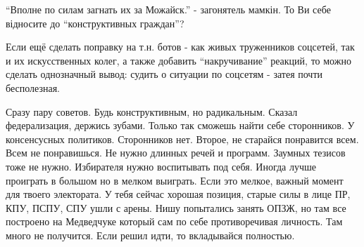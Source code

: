 \begin{itemize}
\begin{itemize}
\end{itemize} %

\enquote{Вполне по силам загнать их за Можайск.} - загонятель мамкін. То Ви себе відносите до \enquote{конструктивных граждан}?


Если ещё сделать поправку на т.н. ботов - как живых труженников соцсетей, так и
их искусственных колег, а также добавить \enquote{накручивание} реакций, то можно
сделать однозначный вывод: судить о ситуации по соцсетям - затея почти
бесполезная.


Сразу пару советов. Будь конструктивным, но радикальным. Сказал федерализация,
держись зубами. Только так сможешь найти себе сторонников. У консенсусных
политиков. Сторонников нет. Второе, не старайся понравится всем. Всем не
понравишься. Не нужно длинных речей и программ. Заумных тезисов тоже не нужно.
Избирателя нужно воспитывать под себя. Иногда лучше проиграть в большом но в
мелком выиграть. Если это мелкое, важный момент для твоего электората. У тебя
сейчас хорошая позиция, старые силы в лице ПР, КПУ, ПСПУ, СПУ ушли с арены.
Нишу попытались занять ОПЗЖ, но там все построено на Медведчуке который сам по
себе противоречивая личность. Там много не получится. Если решил идти, то
вкладывайся полностью.

\end{itemize} %
